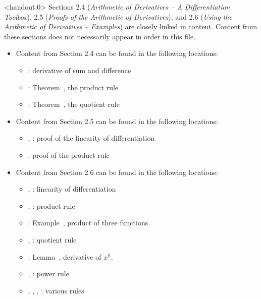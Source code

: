 \begin{frame}<handout:0>
Sections 2.4 (\textit{Arithmetic of Derivatives -- A Differentiation Toolbox}), 2.5 (\textit{Proofs of the Arithmetic of Derivatives}), and 2.6 (\textit{Using the Arithmetic of Derivatives – Examples}) are closely linked in content. Content from these sections does not necessarily appear in order in this file.

\begin{itemize}
\item Content from Section 2.4 can be found in the following locations:
\begin{itemize}
\item \pageref{2.4 addsum}: derivative of sum and difference
\item \pageref{2.4 prodrule}: Theorem~, the product rule
\item \pageref{2.4 quot}: Theorem~, the quotient rule
\end{itemize}

%
\item Content from Section 2.5 can be found in the following locations:
\begin{itemize}
\item \pageref{2.6 sums}, \pageref{2.6 scalar multiple}: proof of the linearity of differentiation
\item \pageref{2.5product}: proof of the product rule
\end{itemize}
%
\item Content from Section 2.6 can be found in the following locations:
\begin{itemize}
\item \pageref{2.6 linear}, \pageref{2.6 linear2}:  linearity of differentiation
\item \pageref{2.6 prod}, \pageref{2.6 prod2}: product rule
\item \pageref{2.6 prod3}: 
Example~, product of three functions
\item \pageref{2.6 quot}, \pageref{2.6 quot2}: quotient rule
\item \pageref{2.6 dxn}: Lemma~, derivative of $x^n$.
\item \pageref{2.6 pr}, \pageref{2.6 pr2}: power rule
\item \pageref{2.6 mix}, \pageref{2.6 mix3}, \pageref{2.6 mix4}, \pageref{2.6 mix2}: various rules
\end{itemize}

\end{itemize}
\end{frame}

